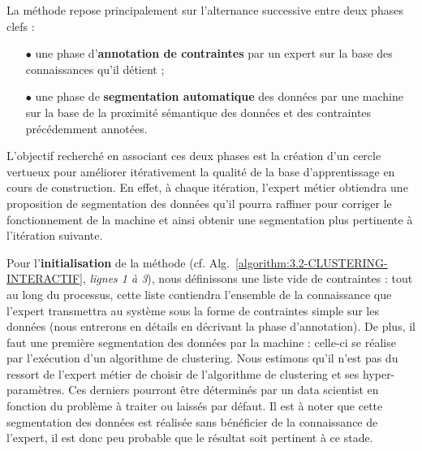 		
		La méthode repose principalement sur l'alternance successive entre deux phases clefs :
		\begin{itemize}
			\item[\(\bullet\)] une phase d'\textbf{annotation de contraintes}
			par un expert sur la base des connaissances qu'il détient ;
			\item[\(\bullet\)] une phase de \textbf{segmentation automatique} des données
			par une machine sur la base de la proximité sémantique des données et des contraintes précédemment annotées.
		\end{itemize}
		
		L'objectif recherché en associant ces deux phases est la création d'un cercle vertueux pour améliorer itérativement la qualité de la base d'apprentissage en cours de construction.
		En effet, à chaque itération, l'expert métier obtiendra une proposition de segmentation des données qu'il pourra raffiner pour corriger le fonctionnement de la machine et ainsi obtenir une segmentation plus pertinente à l'itération suivante.
		
		Pour l'\textbf{initialisation} de la méthode (cf. Alg.~\ref{algorithm:3.2-CLUSTERING-INTERACTIF}, \textit{lignes 1 à 3}), nous définissons une liste vide de contraintes : tout au long du processus, cette liste contiendra l'ensemble de la connaissance que l'expert transmettra au système sous la forme de contraintes simple sur les données (nous entrerons en détails en décrivant la phase d'annotation).
		De plus, il faut une première segmentation des données par la machine : celle-ci se réalise par l'exécution d'un algorithme de clustering.
		Nous estimons qu'il n'est pas du ressort de l'expert métier de choisir de l'algorithme de clustering et ses hyper-paramètres.
		Ces derniers pourront être déterminés par un data scientist en fonction du problème à traiter ou laissés par défaut.
		Il est à noter que cette segmentation des données est réalisée sans bénéficier de la connaissance de l'expert, il est donc peu probable que le résultat soit pertinent à ce stade.
		

